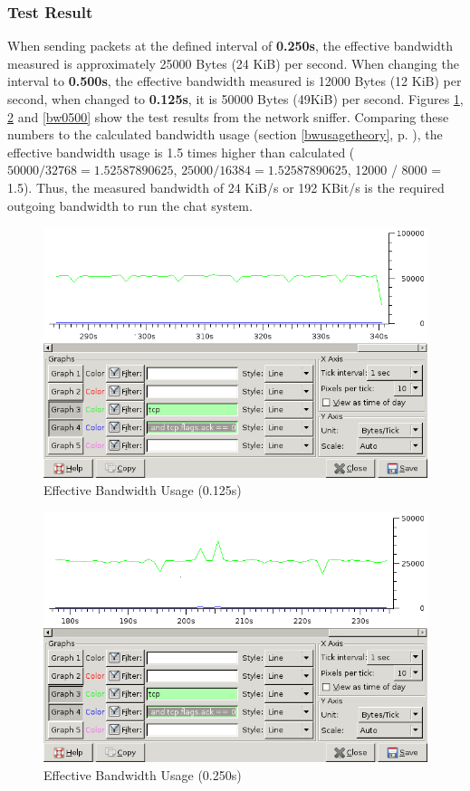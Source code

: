 \subsubsection{Test Result}
When sending packets at the defined interval of
\textbf{0.250s}, the effective bandwidth measured is
approximately 25000 Bytes (24 KiB) per second.
When changing the interval to \textbf{0.500s},
the effective bandwidth measured is
12000 Bytes (12 KiB) per second, when changed
to \textbf{0.125s}, it is 50000 Bytes (49KiB) per second.
Figures \ref{bw0125}, \ref{bw0250} and
\ref{bw0500} show the test results from the network sniffer.
Comparing these numbers to the calculated bandwidth usage
(section \ref{bwusagetheory}, p. \pageref{bwusagetheory}),
the effective bandwidth usage is 1.5 times higher than 
calculated ($50000 / 32768 = 1.52587890625$, $25000 / 16384 = 1.52587890625$,
12000 / 8000 = 1.5). Thus, the measured bandwidth of 24 KiB/s or
192 KBit/s is the required outgoing bandwidth to run the chat system.
\begin{figure}[htbp]
\caption{Effective Bandwidth Usage (0.125s)}
\label{bw0125}
\centering
\includegraphics[scale=0.5]{bandwidth-0125.png}
\end{figure}
\begin{figure}[htbp]
\caption{Effective Bandwidth Usage (0.250s)}
\label{bw0250}
\centering
\includegraphics[scale=0.5]{bandwidth-0250.png}
\end{figure}
